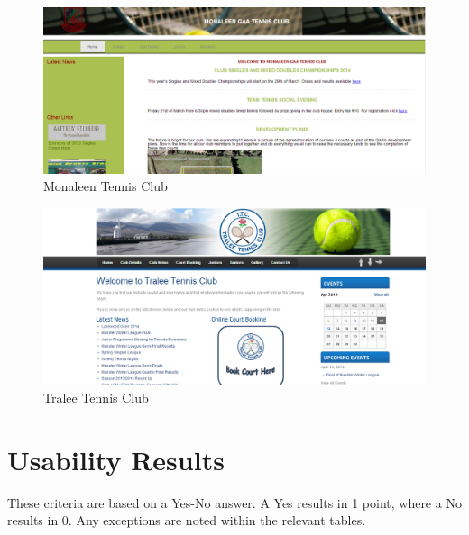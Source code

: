 \begin{figure}[H]
\begin{center}
\includegraphics[scale=0.7, angle=90]{monaleen.PNG}
\end{center}
\caption{Monaleen Tennis Club}
\end{figure}


\begin{figure}[H]
\begin{center}
\includegraphics[scale=0.7, angle=90]{tralee.PNG}
\end{center}
\caption{Tralee Tennis Club}
\end{figure}

\section{Usability Results}
\label{sec:usabilty}

These criteria are based on a Yes-No answer. A Yes results in 1 point, where a No results in 0. Any exceptions are noted within the relevant tables.

